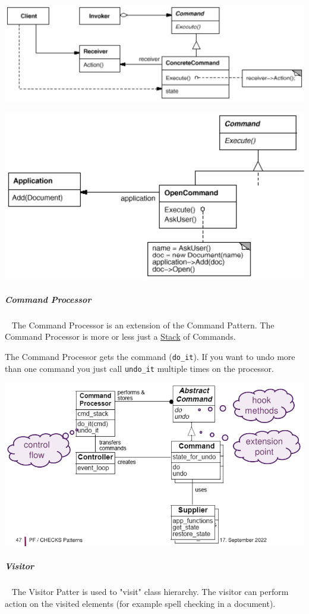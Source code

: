\documentclass[11pt,twoside,landscape]{article}
\begin{document}
\begin{multicols}{3}
{
\begin{center}
\includegraphics[width=.9\linewidth]{img/command.png}
\end{center}
\label{fig:command-class-diagram}
}

{
\begin{center}
\includegraphics[width=.9\linewidth]{img/example_of_command.png}
\end{center}
\label{fig:example-of-command-pattern}
}
\subparagraph{Command Processor} \
\label{sec:orgb7fec81}
The Command Processor is an extension of the Command Pattern.
The Command Processor is more or less just a \href{../../../roam/20210806220134-stack.org}{Stack} of Commands.

The Command Processor gets the command (\texttt{do\_it}).
If you want to undo more than one command you just call \texttt{undo\_it} multiple times on the processor.


{
\begin{center}
\includegraphics[width=.9\linewidth]{img/command_processor.png}
\end{center}
\label{fig:command-processor}
}
\subparagraph{Visitor} \
\label{sec:org7462e16}
The Visitor Patter is used to "visit" class hierarchy.
The visitor can perform action on the visited elements (for example spell checking in a document).


\end{multicols}
\end{document}
